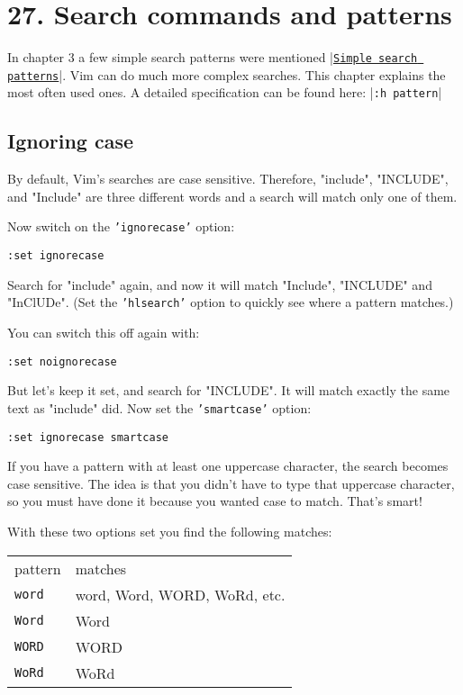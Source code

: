 \section{27. Search commands and patterns}
\label{Search commands and patterns}
In chapter 3 a few simple search patterns were mentioned |\hyperref[Simple search patterns]{\texttt{Simple search patterns}}|.
Vim can do much more complex searches.
This chapter explains the most often used ones.
A detailed specification can be found here: |\texttt{:h pattern}|
\subsection{Ignoring case}
By default, Vim's searches are case sensitive.
Therefore, "include", "INCLUDE", and "Include" are three different words and a search will match only one of them.

Now switch on the \texttt{'ignorecase'} option:

\begin{Verbatim}[samepage=true]
 :set ignorecase
\end{Verbatim}

Search for "include" again, and now it will match "Include", "INCLUDE" and "InClUDe".
(Set the \texttt{'hlsearch'} option to quickly see where a pattern matches.)

You can switch this off again with:

\begin{Verbatim}[samepage=true]
 :set noignorecase
\end{Verbatim}

But let's keep it set, and search for "INCLUDE".
It will match exactly the same text as "include" did.
Now set the \texttt{'smartcase'} option:

\begin{Verbatim}[samepage=true]
 :set ignorecase smartcase
\end{Verbatim}

If you have a pattern with at least one uppercase character, the search becomes case sensitive.
The idea is that you didn't have to type that uppercase character, so you must have done it because you wanted case to match.
That's smart!

With these two options set you find the following matches:

\begin{center} \begin{tabular}{l l}
				pattern & matches \\
				\texttt{word} & word, Word, WORD, WoRd, etc.\\
				\texttt{Word} & Word\\
				\texttt{WORD} & WORD\\
				\texttt{WoRd} & WoRd\\
\end{tabular} \end{center}


